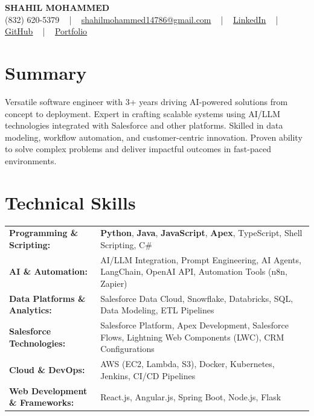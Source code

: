 \documentclass[letterpaper,11pt]{article}
\begin{document}
\begin{center}
    {\fontsize{14pt}{12pt}\selectfont \textbf{\MakeUppercase{Shahil Mohammed}}}\\ \vspace{2pt}
    \fontsize{10pt}{12pt}\selectfont (832) 620-5379 ~ | ~ \href{mailto:shahilmohammed14786@gmail.com}{shahilmohammed14786@gmail.com} ~ | ~  
    \href{https://www.linkedin.com/in/shahil-mohammed-9652931a1/}{\color{blue}\underline{LinkedIn}}  ~ | ~ 
    \href{https://github.com/freakbeast14}{\color{blue}\underline{GitHub}} ~ | ~ 
    \href{https://shahil-mohammed.netlify.app/}{\color{blue}\underline{Portfolio}}
    \vspace{-8pt}
\end{center}

\section{Summary}
\fontsize{9pt}{10pt}\selectfont
Versatile software engineer with 3+ years driving AI-powered solutions from concept to deployment. Expert in crafting scalable systems using AI/LLM technologies integrated with Salesforce and other platforms. Skilled in data modeling, workflow automation, and customer-centric innovation. Proven ability to solve complex problems and deliver impactful outcomes in fast-paced environments.
 \vspace{-5pt}
 
\section{Technical Skills}
        \vspace{-14pt}
        \begin{table}[h]
            \fontsize{9pt}{10pt}\selectfont
            \begin{tabular}{p{0.3\linewidth} p{0.7\linewidth}}
                \textbf{Programming \& Scripting:} & \textbf{Python}, \textbf{Java}, \textbf{JavaScript}, \textbf{Apex}, TypeScript, Shell Scripting, C\# \\
                \textbf{AI \& Automation:} & AI/LLM Integration, Prompt Engineering, AI Agents, LangChain, OpenAI API, Automation Tools (n8n, Zapier) \\
                \textbf{Data Platforms \& Analytics:} & Salesforce Data Cloud, Snowflake, Databricks, SQL, Data Modeling, ETL Pipelines \\
                \textbf{Salesforce Technologies:} & Salesforce Platform, Apex Development, Salesforce Flows, Lightning Web Components (LWC), CRM Configurations \\
                \textbf{Cloud \& DevOps:} & AWS (EC2, Lambda, S3), Docker, Kubernetes, Jenkins, CI/CD Pipelines \\
                \textbf{Web Development \& Frameworks:} & React.js, Angular.js, Spring Boot, Node.js, Flask \\
            \end{tabular}
        \end{table}
 \vspace{-15pt}
 
\end{document}
